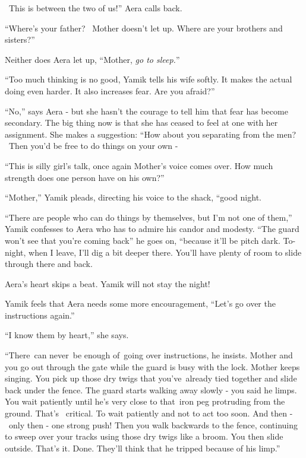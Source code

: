 \documentclass[letterpaper]{article}
\begin{document}
~{\textquotedbl}This is between the two of us!'' Aera calls back.

{}``Where's your father?{\textquotedbl} ~Mother doesn't let up. {\textquotedbl}Where\textcolor{red}{ }are your brothers
and sisters?'' 

Neither does Aera let up, ``Mother, \textit{go to sleep.}{}'' 

{}``Too much thinking is no good,{\textquotedbl} Yamik tells his wife softly. {\textquotedbl}It makes the actual doing
even harder. It also increases fear. Are you afraid?'' 

{}``No,'' says Aera -\textcolor[rgb]{0.0,0.4392157,0.7529412}{ }but she hasn't the courage to tell him that fear has
become secondary. The big thing now is that she has ceased to feel at one with her assignment. She makes a suggestion:
``How about you separating from the men? \ Then you'd be free to do things on your own -{\textquotedbl} 

{}``This is silly girl's talk,{\textquotedbl} once again Mother's voice comes over. {\textquotedbl}How much strength
does one person have on his own?'' 

{}``Mother,'' Yamik pleads, directing his voice to the shack, ``good night.{\textquotedbl} 

{}``There are people who can do things by themselves, but I'm not one of them,''
Yamik\textcolor[rgb]{0.0,0.4392157,0.7529412}{ }confesses to Aera who has to admire his candor and modesty. ``The guard
won't see that you're coming back'' he goes on, ``because it'll be pitch dark. To-night, when I leave, I'll dig a bit
deeper there. You'll have plenty of room to slide through there and back.{\textquotedbl} 

Aera's heart skips a beat. Yamik will not stay the night! 

Yamik feels that Aera needs some more encouragement, ``Let's go over the instructions again.'' 

{}``I know them by heart,'' she says. 

{}``There~can never~be enough of~going over instructions,{\textquotedbl} he insists. {\textquotedbl}Mother and you go
out through the gate while the guard is busy with the lock. Mother keeps singing. You pick up those dry twigs that
you've~already tied together and slide back under the fence. The guard starts walking away slowly
\textcolor[rgb]{0.0,0.4392157,0.7529412}{{}- }you said he limps. You wait patiently until he's very close to that~iron
peg protruding from the ground. That's \ critical. To wait patiently and not to act too soon. And then - \ only then -
one strong push! Then you walk backwards to the fence, continuing to sweep over your tracks using those dry
twigs\textcolor[rgb]{0.0,0.4392157,0.7529412}{ }like a broom. You then slide outside. That's it. Done. They'll think
that he tripped\textcolor[rgb]{0.0,0.4392157,0.7529412}{ }because of his limp.'' 
\end{document}
